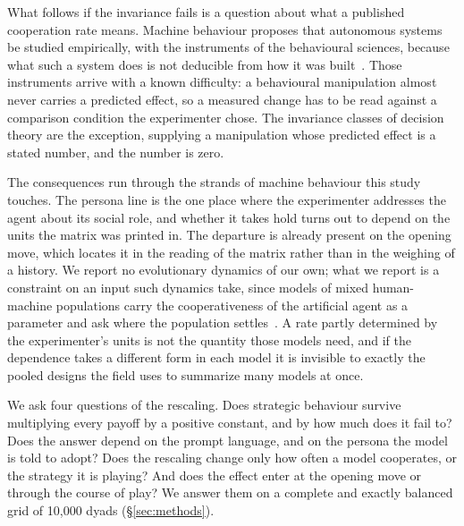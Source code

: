\documentclass[11pt,a4paper]{article}
\begin{document}
What follows if the invariance fails is a question about what a published
cooperation rate means. Machine behaviour proposes that autonomous systems be
studied empirically, with the instruments of the behavioural sciences, because
what such a system does is not deducible from how it was
built~\citep{rahwan2019machine}. Those instruments arrive with a known
difficulty: a behavioural manipulation almost never carries a predicted effect,
so a measured change has to be read against a comparison condition the
experimenter chose. The invariance classes of decision theory are the exception,
supplying a manipulation whose predicted effect is a stated number, and the
number is zero.

The consequences run through the strands of machine behaviour this study
touches. The persona line is the one place where the experimenter addresses the
agent about its social role, and whether it takes hold turns out to depend on
the units the matrix was printed in. The departure is already present on the
opening move, which locates it in the reading of the matrix rather than in the
weighing of a history. We report no evolutionary dynamics of our own; what we
report is a constraint on an input such dynamics take, since models of mixed
human-machine populations carry the cooperativeness of the artificial agent as a
parameter and ask where the population
settles~\citep{santos2018social,han2011intention,han2013good,perc2017statistical,paiva2018engineering}.
A rate partly determined by the experimenter's units is not the quantity those
models need, and if the dependence takes a different form in each model it is
invisible to exactly the pooled designs the field uses to summarize many models
at once.

We ask four questions of the rescaling. Does strategic behaviour survive
multiplying every payoff by a positive constant, and by how much does it fail
to? Does the answer depend on the prompt language, and on the persona the model
is told to adopt? Does the rescaling change only how often a model cooperates,
or the strategy it is playing? And does the effect enter at the opening move or
through the course of play? We answer them on a complete and exactly balanced
grid of 10{,}000 dyads (\S\ref{sec:methods}).
\end{document}
